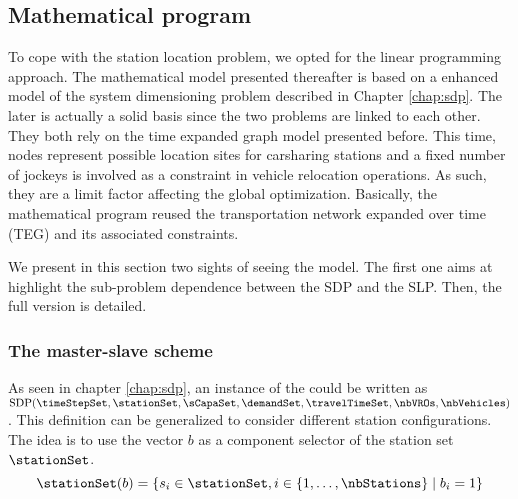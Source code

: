 \begin{bibunit}[ieeetr]
\subsection{Mathematical program}
To cope with the station location problem, we opted for the linear programming approach.
The mathematical model presented thereafter is based on a enhanced model of the system dimensioning problem described in Chapter \ref{chap:sdp}.
The later is actually a solid basis since the two problems are linked to each other.
They both rely on the time expanded graph model presented before.
This time, nodes represent possible location sites for carsharing stations and a fixed number of jockeys is involved as a constraint in vehicle relocation operations.
As such, they are a limit factor affecting the global optimization.
Basically, the mathematical program reused the transportation network expanded over time (TEG) and its associated constraints.

\medskip
We present in this section two sights of seeing the model.
The first one aims at highlight the sub-problem dependence between the SDP and the SLP.
Then, the full version is detailed.

\subsubsection{The master-slave scheme}
As seen in chapter \ref{chap:sdp}, an instance of the {\SDP} could be written as $\text{SDP}(\timeStepSet, \stationSet, \sCapaSet, \demandSet, \travelTimeSet, \nbVROs, \nbVehicles)$.
This definition can be generalized to consider different station configurations.
The idea is to use the vector $b$ as a component selector of the station set $\stationSet$.
\begin{equation} \label{eq:subStationSet}
\stationSet(b) = \{ s_i \in \stationSet, i\in \{1, \dots, \nbStations\} \mid b_i=1\}
\end{equation}


\end{bibunit}
